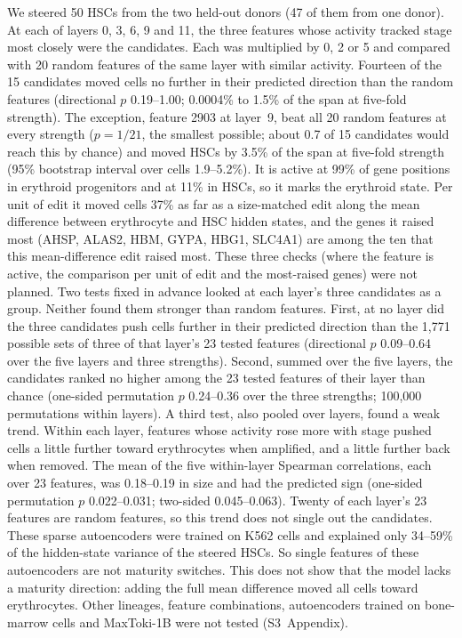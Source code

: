 \documentclass[10pt,letterpaper]{article}
\begin{document}
We steered 50 HSCs from the two held-out donors (47 of them from one
donor). At each of layers 0, 3, 6, 9 and 11, the three features whose
activity tracked stage most closely were the candidates. Each was
multiplied by 0, 2 or 5 and compared with 20 random features of the same
layer with similar activity. Fourteen of the 15 candidates moved cells no
further in their predicted direction than the random features
(directional $p$ 0.19--1.00; 0.0004\% to 1.5\% of the span at five-fold
strength). The exception, feature 2903 at layer~9, beat all 20 random
features at every strength ($p = 1/21$, the smallest possible; about 0.7
of 15 candidates would reach this by chance) and moved HSCs by 3.5\% of
the span at five-fold strength (95\% bootstrap interval over cells
1.9--5.2\%). It is active at 99\% of gene positions in erythroid
progenitors and at 11\% in HSCs, so it marks the erythroid state. Per
unit of edit it moved cells 37\% as far as a size-matched edit along the
mean difference between erythrocyte and HSC hidden states, and the genes
it raised most (AHSP, ALAS2, HBM, GYPA, HBG1, SLC4A1) are among the ten
that this mean-difference edit raised most. These three checks (where
the feature is active, the comparison per unit of edit and the
most-raised genes) were not planned. Two tests fixed in advance looked at
each layer's three candidates as a group. Neither found them stronger
than random features. First, at no layer did the three candidates push
cells further in their predicted direction than the 1,771 possible sets
of three of that layer's 23 tested features (directional $p$ 0.09--0.64
over the five layers and three strengths). Second, summed over the five
layers, the candidates ranked no higher among the 23 tested features of
their layer than chance (one-sided permutation $p$ 0.24--0.36 over the
three strengths; 100,000 permutations within layers). A third test, also
pooled over layers, found a weak trend. Within each layer, features whose activity rose
more with stage pushed cells a little further toward erythrocytes when
amplified, and a little further back when removed. The mean of the five
within-layer Spearman correlations, each over 23 features, was
0.18--0.19 in size and had the predicted sign (one-sided permutation $p$
0.022--0.031; two-sided 0.045--0.063). Twenty of each layer's 23
features are random features, so this trend does not single out the
candidates. These sparse autoencoders were trained on K562 cells and explained only
34--59\% of the hidden-state variance of the steered HSCs. So single
features of these autoencoders are not maturity switches. This does not
show that the model lacks a maturity direction: adding the full mean
difference moved all cells toward erythrocytes. Other lineages, feature
combinations, autoencoders trained on bone-marrow cells and MaxToki-1B
were not tested (S3~Appendix).
\end{document}
